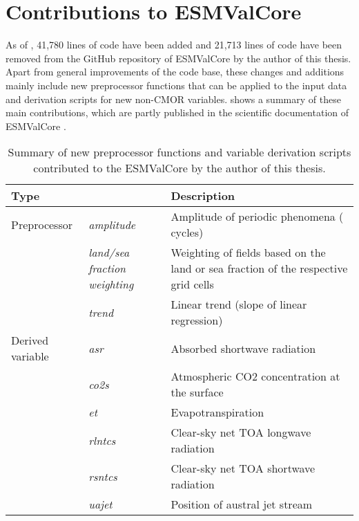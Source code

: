 \section{Contributions to \acs{ESMValCore}}
\label{sec:03:contributions_to_esmvalcore}

As of \TheMonth{}, 41,780 lines of code have been added and 21,713 lines of
code have been removed from the GitHub repository of \ac{ESMValCore} by the
author of this thesis. Apart from general improvements of the code base, these
changes and additions mainly include new preprocessor functions that can be
applied to the input data and derivation scripts for new non-\ac{CMOR}
variables.  shows a summary of these main
contributions, which are partly published in the scientific documentation of
\ac{ESMValCore} \autocite{Righi2020}.

\begin{table}[!b]
  \centering
  \begin{tabulary}{\columnwidth}{L >{\em}L L}
    \toprule
    Type &  & Description \\
    \midrule
    Preprocessor & amplitude & Amplitude of periodic phenomena (\eg{} cycles)
    \\
    \cmidrule(l){2-3}
    & land/sea fraction weighting & Weighting of fields based on the land or
    sea fraction of the respective grid cells \\
    \cmidrule(l){2-3}
    & trend & Linear trend (slope of linear regression) \\
    \midrule
    Derived variable & asr & Absorbed shortwave radiation \\
    \cmidrule(l){2-3}
    & co2s & Atmospheric \acs{CO2} concentration at the surface \\
    \cmidrule(l){2-3}
    & et & Evapotranspiration \\
    \cmidrule(l){2-3}
    & rlntcs & Clear-sky net \acf{TOA} longwave radiation \\
    \cmidrule(l){2-3}
    & rsntcs & Clear-sky net \acs{TOA} shortwave radiation \\
    \cmidrule(l){2-3}
    & uajet & Position of austral jet stream \\
    \bottomrule
  \end{tabulary}
  \caption[
    Summary of new preprocessor functions and variable derivation scripts
    contributed to the \acf{ESMValCore} by the author of this thesis.
  ]{
    Summary of new preprocessor functions and variable derivation scripts
    contributed to the \acf{ESMValCore} by the author of this thesis.
  }
  \label{tab:03:changes_to_esmvalcore}
\end{table}

